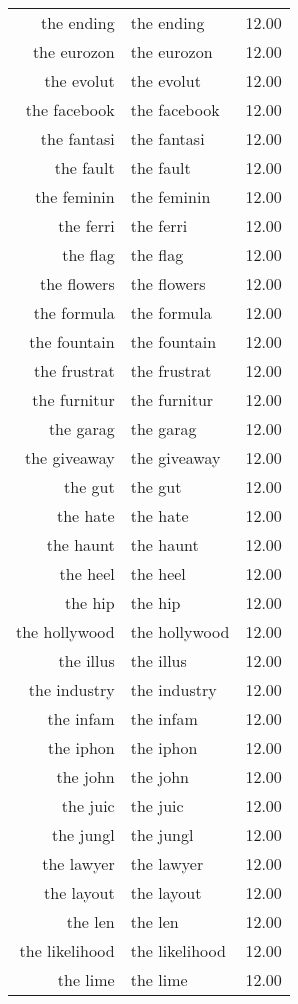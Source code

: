 \begin{table}[ht]
\begin{tabular}{rlr}
  the ending & the ending & 12.00 \\ 
  the eurozon & the eurozon & 12.00 \\ 
  the evolut & the evolut & 12.00 \\ 
  the facebook & the facebook & 12.00 \\ 
  the fantasi & the fantasi & 12.00 \\ 
  the fault & the fault & 12.00 \\ 
  the feminin & the feminin & 12.00 \\ 
  the ferri & the ferri & 12.00 \\ 
  the flag & the flag & 12.00 \\ 
  the flowers & the flowers & 12.00 \\ 
  the formula & the formula & 12.00 \\ 
  the fountain & the fountain & 12.00 \\ 
  the frustrat & the frustrat & 12.00 \\ 
  the furnitur & the furnitur & 12.00 \\ 
  the garag & the garag & 12.00 \\ 
  the giveaway & the giveaway & 12.00 \\ 
  the gut & the gut & 12.00 \\ 
  the hate & the hate & 12.00 \\ 
  the haunt & the haunt & 12.00 \\ 
  the heel & the heel & 12.00 \\ 
  the hip & the hip & 12.00 \\ 
  the hollywood & the hollywood & 12.00 \\ 
  the illus & the illus & 12.00 \\ 
  the industry & the industry & 12.00 \\ 
  the infam & the infam & 12.00 \\ 
  the iphon & the iphon & 12.00 \\ 
  the john & the john & 12.00 \\ 
  the juic & the juic & 12.00 \\ 
  the jungl & the jungl & 12.00 \\ 
  the lawyer & the lawyer & 12.00 \\ 
  the layout & the layout & 12.00 \\ 
  the len & the len & 12.00 \\ 
  the likelihood & the likelihood & 12.00 \\ 
  the lime & the lime & 12.00 \\ 

\end{tabular}
\end{table}
